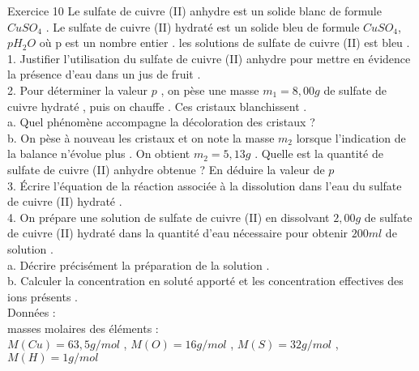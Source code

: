 \documentclass[12pt, french]{article}
\begin{document}
\begin{Box2}{Exercice 10}
Le sulfate de cuivre (II) anhydre est un solide blanc de formule $CuSO_4$ . Le sulfate de cuivre
(II) hydraté est un solide bleu de formule $CuSO_4$, $pH_2O$ où p est un nombre entier . les solutions
de sulfate de cuivre (II) est bleu .
\\1. Justifier l’utilisation du sulfate de cuivre (II) anhydre pour mettre en évidence la présence
d’eau dans un jus de fruit .
\\2. Pour déterminer la valeur $p$ , on pèse une masse $m_1 = 8, 00g$ de sulfate de cuivre hydraté
, puis on chauffe . Ces cristaux blanchissent .
\\a. Quel phénomène accompagne la décoloration des cristaux ?
\\b. On pèse à nouveau les cristaux et on note la masse $m_2$ lorsque l’indication de la
balance n’évolue plus . On obtient $m_2 = 5, 13g$ .
Quelle est la quantité de sulfate de cuivre (II) anhydre obtenue ? En déduire la valeur
de $p$
\\3. Écrire l’équation de la réaction associée à la dissolution dans l’eau du sulfate de cuivre
(II) hydraté .
\\4. On prépare une solution de sulfate de cuivre (II) en dissolvant $2, 00g$ de sulfate de cuivre
(II) hydraté dans la quantité d’eau nécessaire pour obtenir $200ml$ de solution .
\\a. Décrire précisément la préparation de la solution .
\\b. Calculer la concentration en soluté apporté et les concentration effectives des ions
présents .
\\
Données :
\\masses molaires des éléments : \\$M(Cu) = 63, 5g/mol$ , $M(O) = 16g/mol$ , $M(S) = 32g/mol$ ,
$M(H) = 1g/mol$

\end{Box2}
\end{document}
